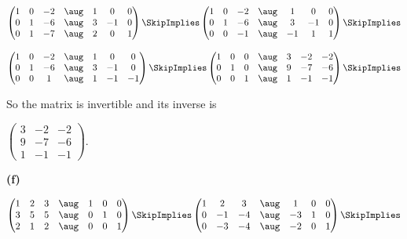\documentclass[oneside,12pt]{amsart}
\begin{document}
\bigskip

$
\begin{pmatrix}
1 & 0 & -2 & \aug & 1 & 0 & 0 \\
0 & 1 & -6 & \aug & 3 & -1 & 0 \\
0 & 1 & -7 & \aug & 2 & 0 & 1
\end{pmatrix}
\SkipImplies
\begin{pmatrix}
1 & 0 & -2 &  \aug & 1 & 0 & 0 \\
0 & 1 & -6 &  \aug & 3 & -1 & 0 \\
0 & 0 & -1 &  \aug & -1 & 1 & 1
\end{pmatrix}
\SkipImplies
$

\bigskip

$
\begin{pmatrix}
1 & 0 & -2 & \aug & 1 & 0 & 0 \\
0 & 1 & -6 & \aug & 3 & -1 & 0 \\
0 & 0 & 1 &  \aug & 1 & -1 & -1
\end{pmatrix}
\SkipImplies
\begin{pmatrix}
1 & 0 & 0 & \aug & 3 & -2 & -2 \\
0 & 1 & 0 & \aug & 9 & -7 & -6 \\
0 & 0 & 1 & \aug & 1 & -1 & -1
\end{pmatrix}
\SkipImplies
$

\bigskip

So the matrix is invertible and its inverse is

$
\begin{pmatrix}
3 & -2 & -2 \\
9 & -7 & -6 \\
1 & -1 & -1
\end{pmatrix}
$.

\bigskip

\textbf{(f)}

\bigskip

$
\begin{pmatrix}
1 & 2 & 3 & \aug & 1 & 0 & 0 \\
3 & 5 & 5 & \aug & 0 & 1 & 0 \\
2 & 1 & 2 & \aug & 0 & 0 & 1
\end{pmatrix}
\SkipImplies
\begin{pmatrix}
1 & 2  & 3  &  \aug & 1 & 0 & 0 \\
0 & -1 & -4 &  \aug & -3 & 1 & 0 \\
0 & -3 & -4 &  \aug & -2 & 0 & 1
\end{pmatrix}
\SkipImplies
$
\end{document}
